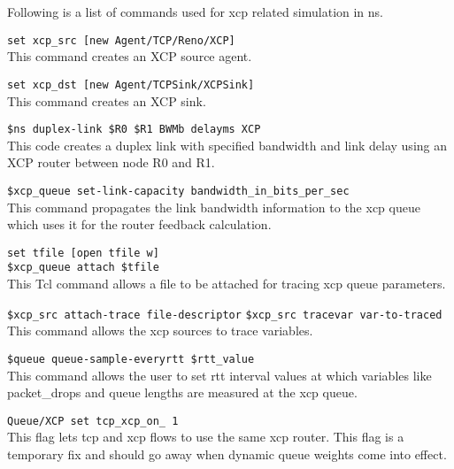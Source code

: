   Following is a list of commands used for xcp related simulation in ns.
  \begin{flushleft}

    {\tt set xcp\_src [new Agent/TCP/Reno/XCP]}\\
    This command creates an XCP source agent.

    {\tt set xcp\_dst [new Agent/TCPSink/XCPSink]}\\
    This command creates an XCP sink.

    {\tt \$ns duplex-link \$R0 \$R1 \<BW\>Mb \<delay\>ms XCP}\\
    This code creates a duplex link with specified bandwidth and link
    delay using an XCP router between node R0 and R1.

    {\tt \$xcp\_queue set-link-capacity \<bandwidth\_in\_bits\_per\_sec\>}\\
    This command propagates the link bandwidth information to the xcp
    queue which uses it for the router feedback calculation.

    {\tt  set tfile [open tfile w] } \\
    {\tt  \$xcp\_queue attach \$tfile } \\
    This Tcl command allows a file to be attached for tracing xcp queue
    parameters. 
    
    {\tt \$xcp\_src attach-trace \<file-descriptor\>} %
    {\tt \$xcp\_src tracevar \<var-to-traced\>}\\
    This command allows the xcp sources to trace variables.
    
    {\tt \$queue queue-sample-everyrtt \$rtt\_value}\\ %
    This command allows the user to set rtt interval values at which
    variables like packet\_drops and queue lengths are measured at the
    xcp queue.

    {\tt Queue/XCP set tcp\_xcp\_on\_ 1}\\
    This flag lets tcp and xcp flows to use the same xcp router. This
    flag is a temporary fix and should go away when dynamic queue
    weights come into effect.
    
  \end{flushleft}
